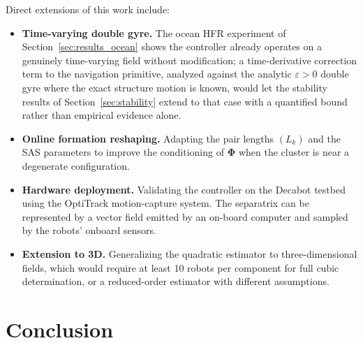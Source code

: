 \documentclass[lettersize,journal]{IEEEtran}
\begin{document}
Direct extensions of this work include:
\begin{itemize}
    \item \textbf{Time-varying double gyre.} The ocean HFR experiment of
          Section~\ref{sec:results_ocean} shows the controller already
          operates on a genuinely time-varying field without modification;
          a time-derivative correction term to the navigation primitive,
          analyzed against the analytic $\varepsilon > 0$ double gyre where
          the exact structure motion is known, would let the stability
          results of Section~\ref{sec:stability} extend to that case with
          a quantified bound rather than empirical evidence alone.
    \item \textbf{Online formation reshaping.} Adapting the pair lengths
          $(L_k)$ and the SAS parameters to improve the conditioning of
          $\boldsymbol{\Phi}$ when the cluster is near a degenerate
          configuration.
    \item \textbf{Hardware deployment.} Validating the controller on the
          Decabot testbed using the OptiTrack motion-capture system. The
          separatrix can be represented by a vector field emitted by an
          on-board computer and sampled by the robots' onboard sensors.
    \item \textbf{Extension to 3D.} Generalizing the quadratic estimator
          to three-dimensional fields, which would require at least 10 robots
          per component for full cubic determination, or a reduced-order
          estimator with different assumptions.
\end{itemize}


\section{Conclusion}
\label{sec:conclusion}
\end{document}
